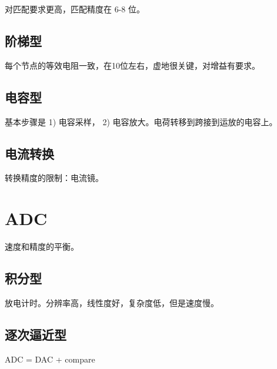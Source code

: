 \documentclass[cn,11pt,chinese,black,simple]{../elegantbook}
\begin{document}
对匹配要求更高，匹配精度在 6-8 位。

\subsection{阶梯型}

每个节点的等效电阻一致，在10位左右，虚地很关键，对增益有要求。

\subsection{电容型}

基本步骤是 1) 电容采样， 2) 电容放大。电荷转移到跨接到运放的电容上。

\subsection{电流转换}

转换精度的限制：电流镜。

\section{ADC} 

速度和精度的平衡。

\subsection{积分型}

放电计时。分辨率高，线性度好，复杂度低，但是速度慢。

\subsection{逐次逼近型}

ADC = DAC + compare


\let\chapname\undefined
\ifx\mainclass\undefined
\end{document}

